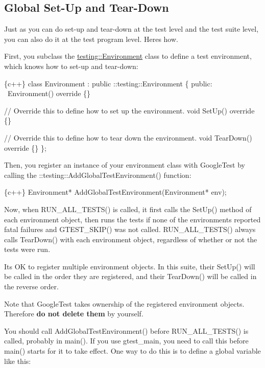 \subsection*{Global Set-\/\+Up and Tear-\/\+Down}

Just as you can do set-\/up and tear-\/down at the test level and the test suite level, you can also do it at the test program level. Here\textquotesingle{}s how.

First, you subclass the {\ttfamily \mbox{\hyperlink{classtesting_1_1Environment}{testing\+::\+Environment}}} class to define a test environment, which knows how to set-\/up and tear-\/down\+:


\begin{DoxyCode}
\{c++\}
class Environment : public ::testing::Environment \{
 public:
  ~Environment() override \{\}

  // Override this to define how to set up the environment.
  void SetUp() override \{\}

  // Override this to define how to tear down the environment.
  void TearDown() override \{\}
\};
\end{DoxyCode}


Then, you register an instance of your environment class with Google\+Test by calling the {\ttfamily \+::testing\+::\+Add\+Global\+Test\+Environment()} function\+:


\begin{DoxyCode}
\{c++\}
Environment* AddGlobalTestEnvironment(Environment* env);
\end{DoxyCode}


Now, when {\ttfamily R\+U\+N\+\_\+\+A\+L\+L\+\_\+\+T\+E\+S\+T\+S()} is called, it first calls the {\ttfamily Set\+Up()} method of each environment object, then runs the tests if none of the environments reported fatal failures and {\ttfamily G\+T\+E\+S\+T\+\_\+\+S\+K\+I\+P()} was not called. {\ttfamily R\+U\+N\+\_\+\+A\+L\+L\+\_\+\+T\+E\+S\+T\+S()} always calls {\ttfamily Tear\+Down()} with each environment object, regardless of whether or not the tests were run.

It\textquotesingle{}s OK to register multiple environment objects. In this suite, their {\ttfamily Set\+Up()} will be called in the order they are registered, and their {\ttfamily Tear\+Down()} will be called in the reverse order.

Note that Google\+Test takes ownership of the registered environment objects. Therefore {\bfseries do not delete them} by yourself.

You should call {\ttfamily Add\+Global\+Test\+Environment()} before {\ttfamily R\+U\+N\+\_\+\+A\+L\+L\+\_\+\+T\+E\+S\+T\+S()} is called, probably in {\ttfamily main()}. If you use {\ttfamily gtest\+\_\+main}, you need to call this before {\ttfamily main()} starts for it to take effect. One way to do this is to define a global variable like this\+:


